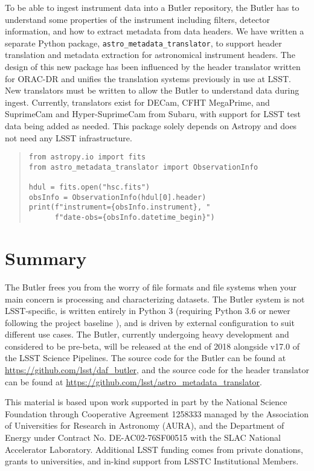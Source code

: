 \documentclass[11pt,twoside]{article}
\begin{document}
To be able to ingest instrument data into a Butler repository, the Butler has to understand some properties of the instrument including filters, detector information, and how to extract metadata from data headers.
We have written a separate Python package, \texttt{astro\_metadata\_translator}, to support header translation and metadata extraction for astronomical instrument headers.
The design of this new package has been influenced by the header translator written for ORAC-DR \citep{2015A&C.....9...40J} and unifies the translation systems previously in use at LSST.
New translators must be written to allow the Butler to understand data during ingest.
Currently, translators exist for DECam, CFHT MegaPrime, and SuprimeCam and Hyper-SuprimeCam from Subaru, with support for LSST test data being added as needed.
This package solely depends on Astropy \citep{2018AJ....156..123A} and does not need any LSST infrastructure.

\begin{quote}
\begin{small}
\begin{verbatim}
from astropy.io import fits
from astro_metadata_translator import ObservationInfo

hdul = fits.open("hsc.fits")
obsInfo = ObservationInfo(hdul[0].header)
print(f"instrument={obsInfo.instrument}, "
      f"date-obs={obsInfo.datetime_begin}")
\end{verbatim}
\end{small}
\end{quote}

\section{Summary}

The Butler frees you from the worry of file formats and file systems when your main concern is processing and characterizing datasets.
The Butler system is not LSST-specific, is written entirely in Python 3 (requiring Python 3.6 or newer following the project baseline \citep{P9-123_adassxxvii}), and is driven by external configuration to suit different use cases.
The Butler, currently undergoing heavy development and considered to be pre-beta, will be released at the end of 2018 alongside v17.0 of the LSST Science Pipelines.
The source code for the Butler can be found at \url{https://github.com/lsst/daf_butler}, and the source code for the header translator can be found at \url{https://github.com/lsst/astro_metadata_translator}.


\acknowledgements This material is based upon work supported in part by the National Science Foundation through Cooperative Agreement 1258333 managed by the Association of Universities for Research in Astronomy (AURA), and the Department of Energy under Contract No. DE-AC02-76SF00515 with the SLAC National Accelerator Laboratory.
Additional LSST funding comes from private donations, grants to universities, and in-kind support from LSSTC Institutional Members.

\end{document}
